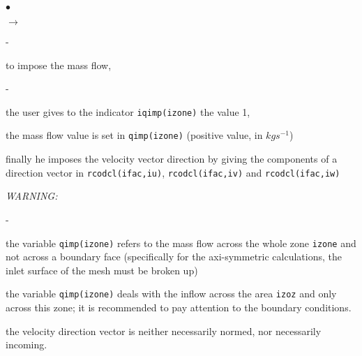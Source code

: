 {{\begin{list}{$\bullet$}{}
\begin{list}{$\rightarrow$}{}
                          \begin{list}{-}{}
                                 \item to impose the mass flow,
                                     \begin{list}{-}{}
                                       \item the user gives to
                                             the indicator
                                             \texttt{iqimp(izone)}
                                             the value 1,
                                       \item  the
                                             mass flow value is set in
                                             \texttt{qimp(izone)}
                                             (positive value, in $kgs^{-1}$)
                                       \item finally he imposes the
                                             velocity vector direction
                                             by giving the components of
                                             a direction vector in
                                             \texttt{rcodcl(ifac,iu)}, \texttt{rcodcl(ifac,iv)} and \texttt{rcodcl(ifac,iw)}
                                     \end{list}

{\em WARNING:
\begin{list}{-}{}
\item the variable \texttt{qimp(izone)} refers to the mass flow across the whole
      zone \texttt{izone} and not across a boundary face (specifically for the axi-symmetric calculations, the inlet surface of the mesh must be broken up)
\item the variable \texttt{qimp(izone)} deals with the inflow across the area \texttt{izoz} and only across this zone; it is recommended to pay attention to the boundary conditions.
\item the velocity direction vector is neither necessarily normed, nor
      necessarily incoming.
\end{list}}


\end{list}
\end{list}
\end{list}}}
